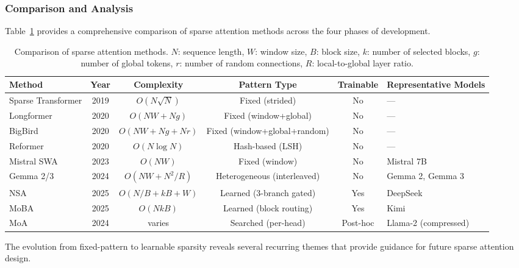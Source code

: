 \subsubsection{Comparison and Analysis}
\label{subsubsec:sparse-comparison}

Table~\ref{tab:sparse-attn-comparison} provides a comprehensive comparison of sparse attention methods across the four phases of development.

\begin{table}[t]
\centering
\caption{Comparison of sparse attention methods. $N$: sequence length, $W$: window size, $B$: block size, $k$: number of selected blocks, $g$: number of global tokens, $r$: number of random connections, $R$: local-to-global layer ratio.}
\label{tab:sparse-attn-comparison}
\small
\begin{tabular}{lccccl}
\toprule
\textbf{Method} & \textbf{Year} & \textbf{Complexity} & \textbf{Pattern Type} & \textbf{Trainable} & \textbf{Representative Models} \\
\midrule
Sparse Transformer & 2019 & $O(N\sqrt{N})$ & Fixed (strided) & No & --- \\
Longformer         & 2020 & $O(NW + Ng)$   & Fixed (window+global) & No & --- \\
BigBird            & 2020 & $O(NW + Ng + Nr)$ & Fixed (window+global+random) & No & --- \\
Reformer           & 2020 & $O(N \log N)$  & Hash-based (LSH) & No & --- \\
Mistral SWA        & 2023 & $O(NW)$        & Fixed (window) & No & Mistral 7B \\
Gemma 2/3          & 2024 & $O(NW + N^2/R)$ & Heterogeneous (interleaved) & No & Gemma 2, Gemma 3 \\
NSA                & 2025 & $O(N/B{+}kB{+}W)$ & Learned (3-branch gated) & Yes & DeepSeek \\
MoBA               & 2025 & $O(NkB)$       & Learned (block routing) & Yes & Kimi \\
MoA                & 2024 & varies         & Searched (per-head) & Post-hoc & Llama-2 (compressed) \\
\bottomrule
\end{tabular}
\end{table}

The evolution from fixed-pattern to learnable sparsity reveals several recurring themes that provide guidance for future sparse attention design.

